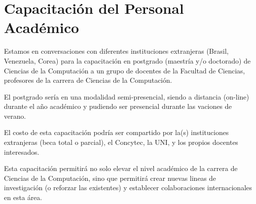 \section{Capacitaci\'on del Personal Acad\'emico}\label{sec:cs-capac-per-academico}

Estamos en conversaciones con diferentes instituciones extranjeras (Brasil, Venezuela, Corea) para la capacitaci\'on en postgrado (maestr\'ia y/o doctorado) de Ciencias de la Computaci\'on a un grupo de docentes de la Facultad de Ciencias, profesores de la carrera de Ciencias de la Computaci\'on. 

El postgrado ser\'ia en una modalidad semi-presencial, siendo a distancia (on-line) durante el a\~no acad\'emico y pudiendo ser presencial durante las vaciones de verano.

El costo de esta capacitaci\'on podr\'ia ser compartido por la(s) instituciones extranjeras (beca total o parcial), el Concytec, la UNI, y los propios docentes interesados.

Esta capacitaci\'on permitir\'a no solo elevar el nivel acad\'emico de la carrera de Ciencias de la Computaci\'on, sino que permitir\'a crear nuevas lineas de investigaci\'on (o reforzar las existentes) y establecer colaboraciones internacionales en esta \'area.
